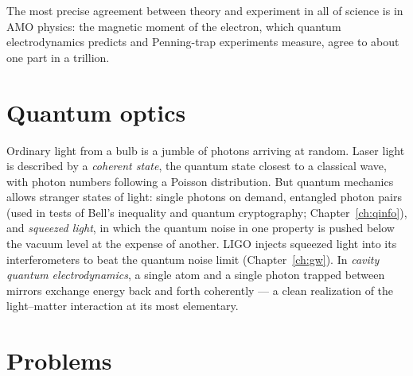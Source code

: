 The most precise agreement between theory and experiment in all of science is in AMO physics: the magnetic moment of the electron, which quantum electrodynamics predicts and Penning-trap experiments measure, agree to about one part in a trillion.

\section{Quantum optics}

Ordinary light from a bulb is a jumble of photons arriving at random. Laser light is described by a \emph{coherent state}, the quantum state closest to a classical wave, with photon numbers following a Poisson distribution. But quantum mechanics allows stranger states of light: single photons on demand, entangled photon pairs (used in tests of Bell's inequality and quantum cryptography; Chapter~\ref{ch:qinfo}), and \emph{squeezed light}, in which the quantum noise in one property is pushed below the vacuum level at the expense of another. LIGO injects squeezed light into its interferometers to beat the quantum noise limit (Chapter~\ref{ch:gw}). In \emph{cavity quantum electrodynamics}, a single atom and a single photon trapped between mirrors exchange energy back and forth coherently --- a clean realization of the light--matter interaction at its most elementary.

\section{Problems}

